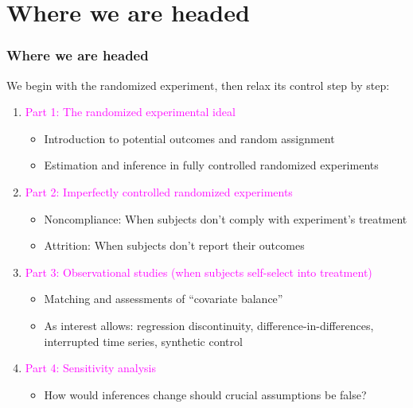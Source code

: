 \documentclass[table, xcolor = {dvipsnames}, 9pt]{beamer}
\theoremstyle{plain}
\begin{document}
\section{Where we are headed}
\begin{frame}[t]
\frametitle{Where we are headed}
\vfill
We begin with the randomized experiment, then relax its control step by step:
\vfill
\begin{enumerate} \vfill
\item[] \textcolor{magenta}{Part 1: The randomized experimental ideal} \vfill
\begin{itemize} \vfill
\item Introduction to potential outcomes and random assignment \vfill
\item Estimation and inference in fully controlled randomized experiments \vfill
\end{itemize} \vfill
\item[] \textcolor{magenta}{Part 2: Imperfectly controlled randomized experiments} \vfill
\begin{itemize} \vfill
\item Noncompliance: When subjects don't comply with experiment's treatment \vfill
\item Attrition: When subjects don't report their outcomes \vfill
\end{itemize} \vfill
\item[] \textcolor{magenta}{Part 3: Observational studies (when subjects self-select into treatment)} \vfill
\begin{itemize} \vfill
\item Matching and assessments of ``covariate balance'' \vfill
\item As interest allows: regression discontinuity, difference-in-differences, interrupted time series, synthetic control \vfill
\end{itemize} \vfill
\item[] \textcolor{magenta}{Part 4: Sensitivity analysis} \vfill
\begin{itemize} \vfill
\item How would inferences change should crucial assumptions be false? \vfill
\end{itemize} \vfill
\end{enumerate}
\vfill
\end{frame}
\end{document}
